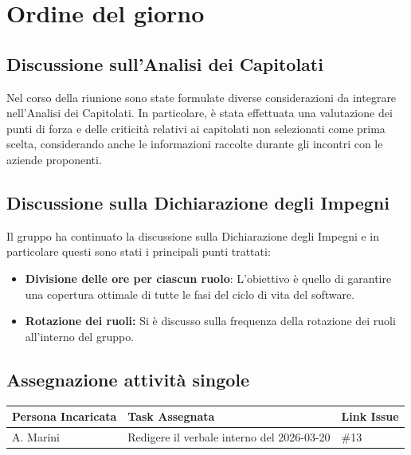 \documentclass[a4paper, 10pt, colorlinks=true, linkcolor=black, urlcolor=blue, citecolor=blue, hidelinks]{article}
\begin{document}
\section{Ordine del giorno}
\subsection{Discussione sull'Analisi dei Capitolati}
Nel corso della riunione sono state formulate diverse considerazioni da integrare nell'Analisi dei Capitolati. In particolare, è stata effettuata una valutazione dei punti di forza e delle criticità relativi ai capitolati non selezionati come prima scelta, considerando anche le informazioni raccolte durante gli incontri con le aziende proponenti.

\subsection{Discussione sulla Dichiarazione degli Impegni}
Il gruppo ha continuato la discussione sulla Dichiarazione degli Impegni e in particolare questi sono stati i principali punti trattati:
\begin{itemize}
    \item \textbf{Divisione delle ore per ciascun ruolo}: L'obiettivo è quello di garantire una copertura ottimale di tutte le fasi del ciclo di vita del software.
    \item \textbf{Rotazione dei ruoli:} Si è discusso sulla frequenza della rotazione dei ruoli all'interno del gruppo.
\end{itemize}

\subsection{Assegnazione attività singole}
\begin{center}
\renewcommand{\arraystretch}{1.4}
\begin{tabular}{|p{4.2cm}|p{6.2cm}|p{2.2cm}|}
\hline
\textbf{Persona Incaricata} & \textbf{Task Assegnata} & \centering\textbf{Link Issue} \tabularnewline
\hline
A. Marini & Redigere il verbale interno del 2026-03-20 & \centering \#13 \tabularnewline
\hline
\end{tabular}
\end{center}


\appendix
\end{document}
